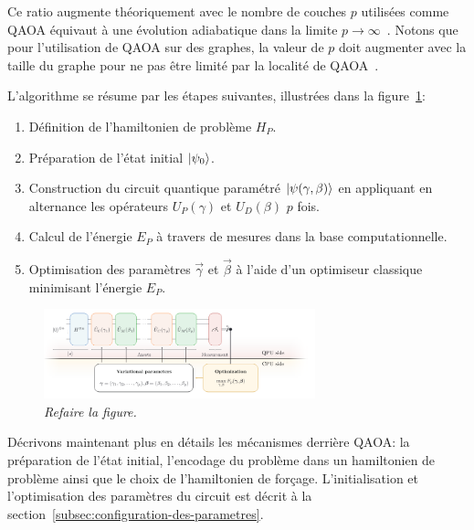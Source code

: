 Ce ratio augmente théoriquement avec le nombre de couches $p$ utilisées comme QAOA équivaut à une évolution adiabatique dans la limite $p \to \infty$~\cite{farhiQuantumApproximateOptimization2014}. Notons que pour l'utilisation de QAOA sur des graphes, la valeur de $p$ doit augmenter avec la taille du graphe pour ne pas être limité par la localité de QAOA~\cite{farhiQuantumApproximateOptimization2020}.

L'algorithme se résume par les étapes suivantes, illustrées dans la figure~\ref{fig:qaoa}:

\begin{enumerate}[(1)]
    \item Définition de l'hamiltonien de problème $H_{P}$.
    \item Préparation de l'état initial $\ket{\psi_{0}}$.
    \item Construction du circuit quantique paramétré $\ket{\psi(\gamma, \beta)}$ en appliquant en alternance les opérateurs $U_{P}(\gamma)$ et $U_{D}(\beta)$ $p$ fois.
    \item Calcul de l'énergie $E_{P}$ à travers de mesures dans la base computationnelle.
    \item Optimisation des paramètres $\vec{\gamma}$ et $\vec{\beta}$ à l'aide d'un optimiseur classique minimisant l'énergie $E_{P}$.
\end{enumerate}


\begin{figure}[ht!]
    \centering
    \includegraphics[width=0.7\textwidth]{figures/qaoa.png}
    \caption[Algorithme quantique d'optimisation approximative]{\textcolor{mydarkred}{\textit{Refaire la figure.}}}
    \label{fig:qaoa}
\end{figure}

Décrivons maintenant plus en détails les mécanismes derrière QAOA: la préparation de l'état initial, l'encodage du problème dans un hamiltonien de problème ainsi que le choix de l'hamiltonien de forçage. L'initialisation et l'optimisation des paramètres du circuit est décrit à la section~\ref{subsec:configuration-des-parametres}.


